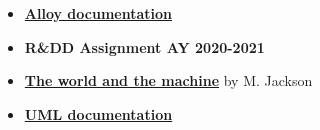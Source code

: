 \documentclass[../../main.tex]{subfiles}
\begin{document}
\begin{itemize}
    \item \textbf{\href{https://alloytools.org/documentation.html}{Alloy documentation}}
    \item \textbf{R&DD Assignment AY 2020-2021}
    \item \textbf{\href{http://mcs.open.ac.uk/mj665/icse17kn.pdf}{The world and the machine}} by M. Jackson
    \item \textbf{\href{https://www.uml-diagrams.org/}{UML documentation}}
\end{itemize}
\end{document}
